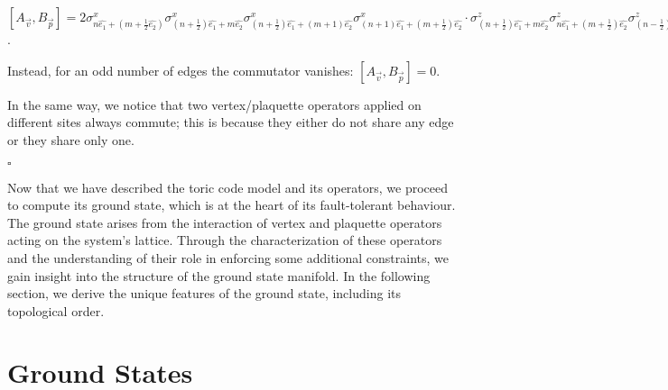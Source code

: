 \documentclass{Configuration_Files/PoliMi3i_thesis}
\begin{document}
\begin{center}
	
	$[A_{\vec{v}},B_{\vec{p}}] = 2
	\sigma^x_{n\hat{e_1} + (m+\frac{1}{2}\hat{e_2})} \sigma^x_{(n+ \frac{1}{2})\hat{e_1} + m\hat{e_2}} \sigma^x_{(n+ \frac{1}{2})\hat{e_1} + (m + 1)\hat{e_2}} \sigma^x_{(n+ 1)\hat{e_1} + (m + \frac{1}{2})\hat{e_2}} \cdot
	\sigma^z_{(n+\frac{1}{2})\hat{e_1} + m\hat{e_2}} \sigma^z_{n\hat{e_1}+(m+\frac{1}{2})\hat{e_2}} \sigma^z_{(n-\frac{1}{2})\hat{e_1} + m\hat{e_2}} \sigma^z_{n\hat{e_1}+(m-\frac{1}{2})\hat{e_2}} $. \newline

\end{center}
Instead, for an odd number of edges the commutator vanishes: $[A_{\vec{v}},B_{\vec{p}}]=0$.

In the same way, we notice that two vertex/plaquette operators applied on different sites always commute; this is because they either do not share any edge or they share only one.\newline


\hfill $\square$

Now that we have described the toric code model and its operators, we proceed to compute its ground state, which is at the heart of its fault-tolerant behaviour. The ground state arises from the interaction of vertex and plaquette operators acting on the system's lattice. Through the characterization of these operators and the understanding of their role in enforcing some additional constraints, we gain insight into the structure of the ground state manifold. \newline
In the following section, we derive the unique features of the ground state, including its topological order. \newline 




















\newpage
\section{Ground States}
\label{sec:GS}
\end{document}
